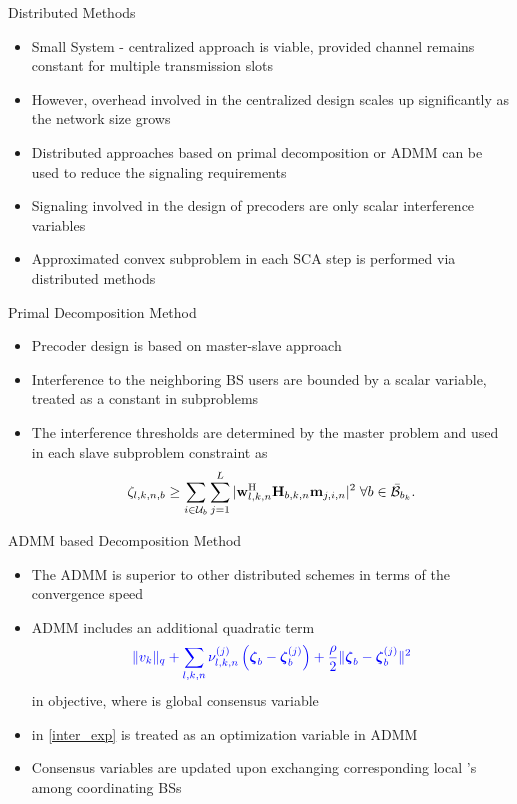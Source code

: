 \documentclass[9pt]{beamer}
\begin{document}
\begin{frame}{Distributed Methods}
	\begin{itemize}
		\item \alert{Small System - centralized approach is viable}, provided channel remains constant for multiple transmission slots
		\item However, overhead involved in the centralized design scales up significantly as the network size grows
		\item Distributed approaches based on primal decomposition or \acs{ADMM} can be used to reduce the signaling requirements
		\item Signaling involved in the design of precoders are only \alert{scalar interference variables}
		\item Approximated convex subproblem in each \acs{SCA} step is performed via distributed methods
	\end{itemize}
\end{frame}

\begin{frame}{Primal Decomposition Method}
	\begin{itemize}
		\item Precoder design is based on master-slave approach
		\item Interference to the neighboring \ac{BS} users are \alert{bounded by a scalar variable, treated as a constant in subproblems}
		\item The interference thresholds are determined by the master problem and used in each slave subproblem constraint as
		\begin{equation} \label{inter_exp} \scriptsize
		\zeta_{l,k,n,b} \geq \sum_{i \in \mathcal{U}_b} \sum_{j = 1}^L |\mathbf{w}_{l,k,n}^{\mathrm{H}} \mathbf{H}_{b,k,n} \mathbf{m}_{j,i,n} |^2 \; \forall b \in \bar{\mathcal{B}}_{b_k}.
		\end{equation}
	\end{itemize}
\end{frame}

\begin{frame}{ADMM based Decomposition Method}
	\begin{itemize}
		\item The \ac{ADMM} is superior to other distributed schemes in terms of the convergence speed
		\item \ac{ADMM} includes an additional quadratic term 
		\begin{equation}
		\color{blue} \|v_k\|_q + \sum_{l,k,n} \nu_{l,k,n}^{(j)} \left ( {\boldsymbol{\zeta}}_b - {\boldsymbol{\zeta}}^{(j)}_b \right ) + \frac{\rho}{2}  \| {\boldsymbol{\zeta}}_b - {\boldsymbol{\zeta}}^{(j)}_b \|^2
		\end{equation}
		in objective, where  is global consensus variable
		\item {} in \eqref{inter_exp} is \alert{treated as an optimization variable in \ac{ADMM}}
		\item Consensus variables are updated upon exchanging corresponding local 's among coordinating \acp{BS}
	\end{itemize}
\end{frame}
\end{document}
